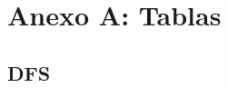 \documentclass[%
	final,
	reprint,
	notitlepage,
	narroweqnarray,
	inline,
	twoside,
	invited
	]{ieee}
\begin{document}








\clearpage


\onecolumn
\section*{Anexo A: Tablas}
\subsection{DFS}
\end{document}
